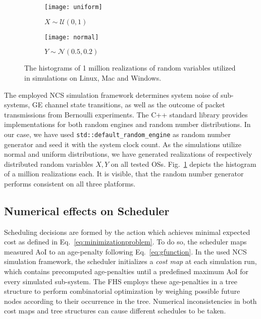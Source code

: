 \begin{figure}[htbp]
  \centering
  \begin{subfigure}[b]{0.49\textwidth}
      \centering
      \texttt{[image: uniform]}
      \caption{$X \sim \mathcal{U}(0, 1)$}
  \end{subfigure}
  \hfill
  \begin{subfigure}[b]{0.49\textwidth}
      \centering
      \texttt{[image: normal]}
      \caption{$Y \sim \mathcal{N}(0.5, 0.2)$}
  \end{subfigure}
    \caption{The histograms of 1 million realizations of random variables utilized in simulations on Linux, Mac and Windows.}
    \label{fig:randomCheck}
\end{figure}

The employed NCS simulation framework determines system noise of sub-systems, GE
channel state transitions, as well as the outcome of packet transmissions from
Bernoulli experiments. The C++ standard library provides implementations for
both random engines and random number distributions. In our case, we have used
\texttt{std::default\_random\_engine} as random number generator and seed it
with the system clock count. As the simulations utilize normal and uniform
distributions, we have generated realizations of respectively distributed random
variables $X, Y$ on all tested OSs. Fig.~\ref{fig:randomCheck} depicts the
histogram of a million realizations each. It is visible, that the random number
generator performs consistent on all three platforms.

\subsection{Numerical effects on Scheduler}

Scheduling decisions are formed by the action which achieves minimal expected
cost as defined in Eq.~\eqref{eq:minimizationproblem}. To do so, the scheduler
maps measured AoI to an age-penalty following Eq.~\eqref{eq:gfunction}. In the
used NCS simulation framework, the scheduler initializes a \textit{cost map} at
each simulation run, which contains precomputed age-penalties until a predefined
maximum AoI for every simulated sub-system. The FHS employs these age-penalties
in a tree structure to perform combinatorial optimization by weighing possible
future nodes according to their occurrence in the tree. Numerical
inconsistencies in both cost maps and tree structures can cause different
schedules to be taken.

